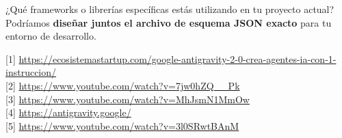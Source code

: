 \documentclass[12pt, a4paper]{article}
\begin{document}
¿Qué frameworks o librerías específicas estás utilizando en tu proyecto actual? Podríamos \textbf{diseñar juntos el archivo de esquema JSON exacto} para tu entorno de desarrollo.

[1] \url{https://ecosistemastartup.com/google-antigravity-2-0-crea-agentes-ia-con-1-instruccion/} \\{}
[2] \url{https://www.youtube.com/watch?v=7jw0hZQ__Pk} \\{}
[3] \url{https://www.youtube.com/watch?v=MhJsmN1MmOw} \\{}
[4] \url{https://antigravity.google/} \\{}
[5] \url{https://www.youtube.com/watch?v=3l0SRwtBAnM}
\end{document}
